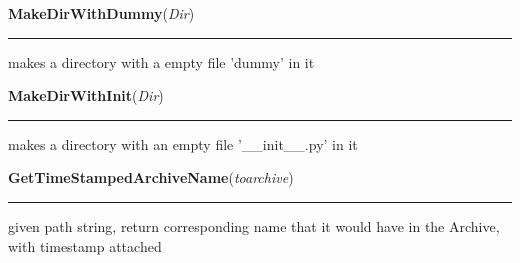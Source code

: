     \label{System:Utils:MakeDirWithDummy}

    \vspace{0.5ex}

\hspace{.8\funcindent}\begin{boxedminipage}{\funcwidth}

    \raggedright \textbf{MakeDirWithDummy}(\textit{Dir})

    \vspace{-1.5ex}

    \rule{\textwidth}{0.5\fboxrule}
\setlength{\parskip}{2ex}
    makes a directory with a empty file 'dummy' in it

\setlength{\parskip}{1ex}
    \end{boxedminipage}

    \label{System:Utils:MakeDirWithInit}

    \vspace{0.5ex}

\hspace{.8\funcindent}\begin{boxedminipage}{\funcwidth}

    \raggedright \textbf{MakeDirWithInit}(\textit{Dir})

    \vspace{-1.5ex}

    \rule{\textwidth}{0.5\fboxrule}
\setlength{\parskip}{2ex}
    makes a directory with an empty file '\_\_init\_\_.py' in it

\setlength{\parskip}{1ex}
    \end{boxedminipage}

    \label{System:Utils:GetTimeStampedArchiveName}

    \vspace{0.5ex}

\hspace{.8\funcindent}\begin{boxedminipage}{\funcwidth}

    \raggedright \textbf{GetTimeStampedArchiveName}(\textit{toarchive})

    \vspace{-1.5ex}

    \rule{\textwidth}{0.5\fboxrule}
\setlength{\parskip}{2ex}
    given path string, return corresponding name that it would have in the 
    Archive, with timestamp attached

\setlength{\parskip}{1ex}
    \end{boxedminipage}

